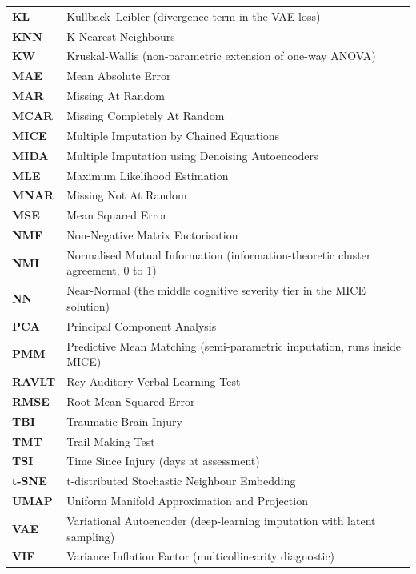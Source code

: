 \begin{longtable}{@{}l p{\dimexpr\textwidth-3.2cm\relax}@{}}
\textbf{KL}         & Kullback--Leibler (divergence term in the VAE loss) \\
\textbf{KNN}        & K-Nearest Neighbours \\
\textbf{KW}         & Kruskal-Wallis (non-parametric extension of one-way ANOVA) \\
\textbf{MAE}        & Mean Absolute Error \\
\textbf{MAR}        & Missing At Random \\
\textbf{MCAR}       & Missing Completely At Random \\
\textbf{MICE}       & Multiple Imputation by Chained Equations \\
\textbf{MIDA}       & Multiple Imputation using Denoising Autoencoders \\
\textbf{MLE}        & Maximum Likelihood Estimation \\
\textbf{MNAR}       & Missing Not At Random \\
\textbf{MSE}        & Mean Squared Error \\
\textbf{NMF}        & Non-Negative Matrix Factorisation \\
\textbf{NMI}        & Normalised Mutual Information (information-theoretic cluster agreement, $0$ to $1$) \\
\textbf{NN}         & Near-Normal (the middle cognitive severity tier in the MICE solution) \\
\textbf{PCA}        & Principal Component Analysis \\
\textbf{PMM}        & Predictive Mean Matching (semi-parametric imputation, runs inside MICE) \\
\textbf{RAVLT}      & Rey Auditory Verbal Learning Test \\
\textbf{RMSE}       & Root Mean Squared Error \\
\textbf{TBI}        & Traumatic Brain Injury \\
\textbf{TMT}        & Trail Making Test \\
\textbf{TSI}        & Time Since Injury (days at assessment) \\
\textbf{t-SNE}      & t-distributed Stochastic Neighbour Embedding \\
\textbf{UMAP}       & Uniform Manifold Approximation and Projection \\
\textbf{VAE}        & Variational Autoencoder (deep-learning imputation with latent sampling) \\
\textbf{VIF}        & Variance Inflation Factor (multicollinearity diagnostic) \\
\end{longtable}
